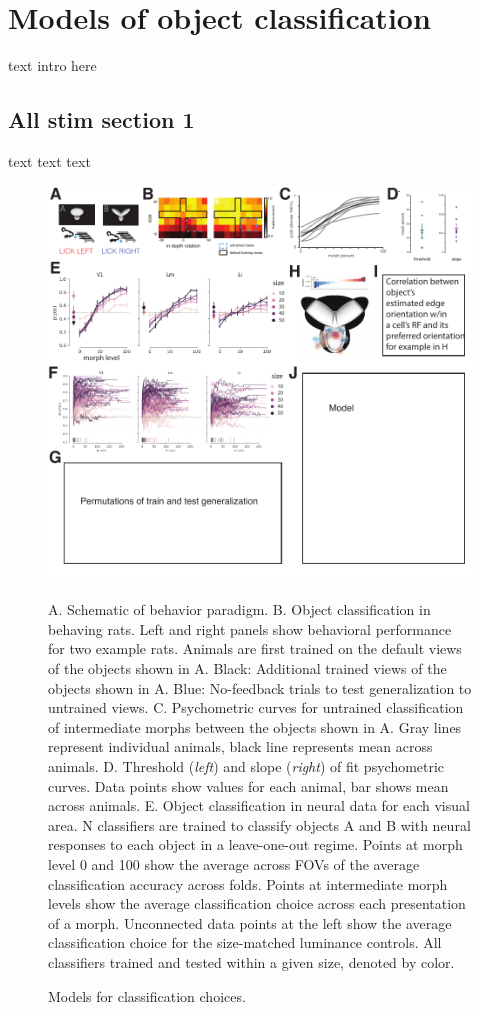 \documentclass{article}
\begin{document}
\section{Models of object classification}
text intro here

\subsection{All stim section 1}
text text text

\begin{figure}[ht]
  \includegraphics[width=\textwidth]{figures/allstim.pdf}
  \caption{Models for classification choices.}
  \medskip
  \small
  A.  Schematic of behavior paradigm.
  B.  Object classification in behaving rats.  Left and right panels show behavioral performance for two example rats.  Animals are first trained on the default views of the objects shown in A.  Black:  Additional trained views of the objects shown in A.  Blue:  No-feedback trials to test generalization to untrained views. 
  C.  Psychometric curves for untrained classification of intermediate morphs between the objects shown in A. Gray lines represent individual animals, black line represents mean across animals. 
  D.  Threshold (\textit{left}) and slope (\textit{right}) of fit psychometric curves. Data points show values for each animal, bar shows mean across animals. 
  E.  Object classification in neural data for each visual area.  N classifiers are trained to classify objects A and B with neural responses to each object  in a leave-one-out regime.  Points at morph level 0 and 100 show the average across FOVs of the average classification accuracy across folds.  Points at intermediate morph levels show the average classification choice across each presentation of a morph.  Unconnected data points at the left show the average classification choice for the size-matched luminance controls.  All classifiers trained and tested within a given size, denoted by color.  

\end{figure}
\end{document}
